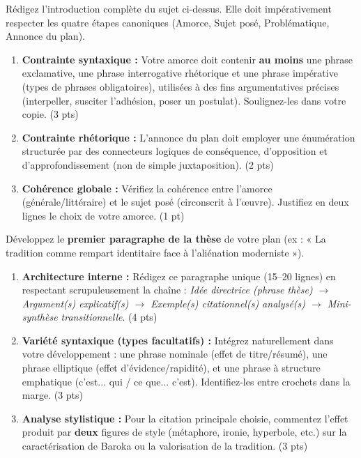 \documentclass[11pt]{article}
\begin{document}
\begin{exercice}
Rédigez l'introduction complète du sujet ci-dessus. Elle doit impérativement respecter les quatre étapes canoniques (Amorce, Sujet posé, Problématique, Annonce du plan).

\begin{enumerate}
    \item \textbf{Contrainte syntaxique :} Votre amorce doit contenir \textbf{au moins} une phrase exclamative, une phrase interrogative rhétorique et une phrase impérative (types de phrases obligatoires), utilisées à des fins argumentatives précises (interpeller, susciter l'adhésion, poser un postulat). Soulignez-les dans votre copie. (3 pts)
    \item \textbf{Contrainte rhétorique :} L'annonce du plan doit employer une énumération structurée par des connecteurs logiques de conséquence, d'opposition et d'approfondissement (non de simple juxtaposition). (2 pts)
    \item \textbf{Cohérence globale :} Vérifiez la cohérence entre l'amorce (générale/littéraire) et le sujet posé (circonscrit à l'œuvre). Justifiez en deux lignes le choix de votre amorce. (1 pt)
\end{enumerate}
\end{exercice}

\begin{exercice}
Développez le \textbf{premier paragraphe de la thèse} de votre plan (ex : « La tradition comme rempart identitaire face à l'aliénation moderniste »).

\begin{enumerate}
    \item \textbf{Architecture interne :} Rédigez ce paragraphe unique (15--20 lignes) en respectant scrupuleusement la chaîne : \textit{Idée directrice (phrase thèse) $\rightarrow$ Argument(s) explicatif(s) $\rightarrow$ Exemple(s) citationnel(s) analysé(s) $\rightarrow$ Mini-synthèse transitionnelle}. (4 pts)
    \item \textbf{Variété syntaxique (types facultatifs) :} Intégrez naturellement dans votre développement : une phrase nominale (effet de titre/résumé), une phrase elliptique (effet d'évidence/rapidité), et une phrase à structure emphatique (c'est... qui / ce que... c'est). Identifiez-les entre crochets dans la marge. (3 pts)
    \item \textbf{Analyse stylistique :} Pour la citation principale choisie, commentez l'effet produit par \textbf{deux} figures de style (métaphore, ironie, hyperbole, etc.) sur la caractérisation de Baroka ou la valorisation de la tradition. (3 pts)
\end{enumerate}
\end{exercice}
\end{document}
